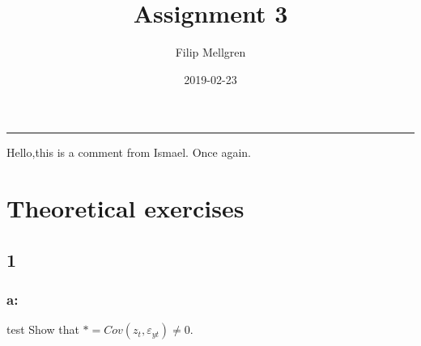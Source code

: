 \documentclass[]{article}
\title{Assignment 3}
\author{Filip Mellgren}
\date{2019-02-23}
\begin{document}
\maketitle

{
\setcounter{tocdepth}{2}
\tableofcontents
}
\begin{center}\rule{0.5\linewidth}{\linethickness}\end{center}

Hello,this is a comment from Ismael. Once again.

\section{Theoretical exercises}\label{theoretical-exercises}

\subsection{1}\label{section}

\subsubsection{a:}\label{a}

test Show that \(* = Cov(z_t, \varepsilon_{yt}) \neq 0\).
\end{document}
